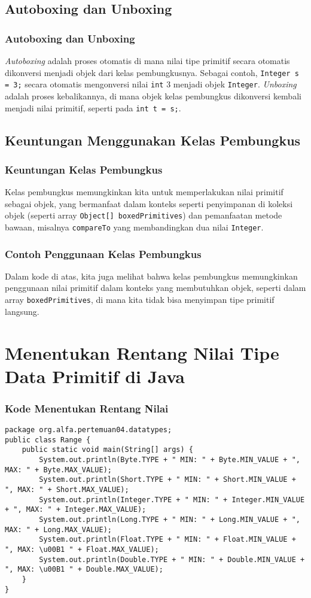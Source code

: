 \documentclass[aspectratio=169, table]{beamer}
\begin{document}
\subsection{Autoboxing dan Unboxing}
\begin{frame}[fragile]
	\frametitle{Autoboxing dan Unboxing}
	\textit{Autoboxing} adalah proses otomatis di mana nilai tipe primitif secara otomatis dikonversi menjadi objek dari kelas pembungkusnya. Sebagai contoh, \texttt{Integer s = 3;} secara otomatis mengonversi nilai \texttt{int} 3 menjadi objek \texttt{Integer}. \textit{Unboxing} adalah proses kebalikannya, di mana objek kelas pembungkus dikonversi kembali menjadi nilai primitif, seperti pada \texttt{int t = s;}.
\end{frame}

\subsection{Keuntungan Menggunakan Kelas Pembungkus}
\begin{frame}[fragile]
	\frametitle{Keuntungan Kelas Pembungkus}
	Kelas pembungkus memungkinkan kita untuk memperlakukan nilai primitif sebagai objek, yang bermanfaat dalam konteks seperti penyimpanan di koleksi objek (seperti array \texttt{Object[] boxedPrimitives}) dan pemanfaatan metode bawaan, misalnya \texttt{compareTo} yang membandingkan dua nilai \texttt{Integer}.
\end{frame}

\begin{frame}[fragile]
	\frametitle{Contoh Penggunaan Kelas Pembungkus}
	Dalam kode di atas, kita juga melihat bahwa kelas pembungkus memungkinkan penggunaan nilai primitif dalam konteks yang membutuhkan objek, seperti dalam array \texttt{boxedPrimitives}, di mana kita tidak bisa menyimpan tipe primitif langsung.
\end{frame}

\section{Menentukan Rentang Nilai Tipe Data Primitif di Java}

\begin{frame}[fragile]
\frametitle{Kode Menentukan Rentang Nilai}
\vspace{15pt}
\begin{lstlisting}[style=JavaStyle]
package org.alfa.pertemuan04.datatypes;
public class Range {
	public static void main(String[] args) {
		System.out.println(Byte.TYPE + " MIN: " + Byte.MIN_VALUE + ", MAX: " + Byte.MAX_VALUE);
		System.out.println(Short.TYPE + " MIN: " + Short.MIN_VALUE + ", MAX: " + Short.MAX_VALUE);
		System.out.println(Integer.TYPE + " MIN: " + Integer.MIN_VALUE + ", MAX: " + Integer.MAX_VALUE);
		System.out.println(Long.TYPE + " MIN: " + Long.MIN_VALUE + ", MAX: " + Long.MAX_VALUE);
		System.out.println(Float.TYPE + " MIN: " + Float.MIN_VALUE + ", MAX: \u00B1 " + Float.MAX_VALUE);
		System.out.println(Double.TYPE + " MIN: " + Double.MIN_VALUE + ", MAX: \u00B1 " + Double.MAX_VALUE);
	}
}
\end{lstlisting}
\end{frame}
\end{document}
